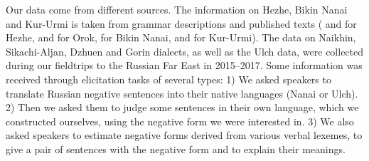 \documentclass[output=paper]{langscibook}
\begin{document}
Our data come from different sources. The information on Hezhe, Bikin Nanai and Kur-Urmi is taken from grammar descriptions and published texts (\citet{zhang1989a} and \citet{zhang2013a} for Hezhe, \citet{petrova1967a} and \citet{tsumagari2009a} for Orok, \citet{sem1976a} for Bikin Nanai, and \citet{sunik1958a} for Kur-Urmi). The data on Naikhin, Sikachi-Aljan, Dzhuen and Gorin dialects, as well as the Ulch data, were collected during our fieldtrips to the Russian Far East in 2015–2017. Some information was received through elicitation tasks of several types: 1) We asked speakers to translate Russian negative sentences into their native languages (Nanai or Ulch). 2) Then we asked them to judge some sentences in their own language, which we constructed ourselves, using the negative form we were interested in. 3) We also asked speakers to estimate negative forms derived from various verbal lexemes, to give a pair of sentences with the negative form and to explain their meanings.
\end{document}
